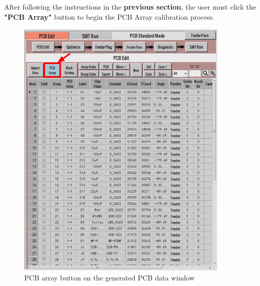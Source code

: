 \documentclass[a4paper,10pt]{report}
\begin{document}
After following the instructions in the \textbf{previous section}, the user must click the \textbf{"PCB Array"} button to begin the PCB Array calibration process.
\begin{figure}[!htb]
 \centering
 \includegraphics[width=0.9\textwidth]{scrot7.png}
 \caption{PCB array button on the generated PCB data window}
\end{figure}
\newpage
\end{document}

